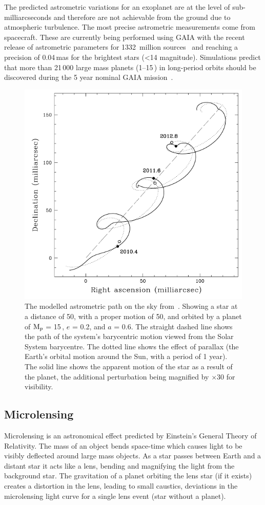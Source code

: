 The predicted astrometric variations for an exoplanet are at the level of sub-milliarcseconds and therefore are not achievable from the ground due to atmospheric turbulence.
The most precise astrometric measurements come from spacecraft.
These are currently being performed using GAIA with the recent release of astrometric parameters for 1332~million sources~\citep{collaboration_gaia_2018} and reaching a precision of 0.04\,mas for the brightest stars (<14 magnitude).
Simulations predict that more than 21\,000 large mass planets (1--15\,\Mjup) in long-period orbits should be discovered during the 5 year nominal GAIA mission~\citep{perryman_astrometric_2014}.

\begin{figure}
    \centering
    \includegraphics[width=0.5\linewidth]{./figures/introduction/Astrometry_Perryman2000.png}
    \caption[Modelled astrometric path on the sky.]{The modelled astrometric path on the sky from~\citet{perryman_extrasolar_2000}.
        Showing a star at a distance of 50\pc, with a proper motion of 50\masperyr{}, and orbited by a planet of $\textrm{M}_{p}$ = 15\,\Mjup{}, $e$ = 0.2, and $a$ = 0.6\AU{}.
        The straight dashed line shows the path of the system's barycentric motion viewed from the Solar System barycentre.
        The dotted line shows the effect of parallax (the Earth's orbital motion around the Sun, with a period of 1 year).
        The solid line shows the apparent motion of the star as a result of the planet, the additional perturbation being magnified by $\times 30$ for visibility.}
    \label{fig:astrometry_perryman}
\end{figure}


\subsection{Microlensing}
\label{subsec:microlensing}
Microlensing is an astronomical effect predicted by Einstein's General Theory of Relativity.
The mass of an object bends space-time which causes light to be visibly deflected around large mass objects.
As a star passes between Earth and a distant star it acts like a lens, bending and magnifying the light from the background star.
The gravitation of a planet orbiting the lens star (if it exists) creates a distortion in the lens, leading to small caustics, deviations in the microlensing light curve for a single lens event (star without a planet).

